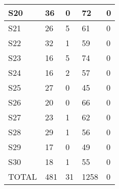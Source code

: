 \begin{table}[H]
\begin{tabular}{|l|p{2cm}|p{2cm}|l|p{2cm}|}
S20 & 36 & 0 & 72 & 0 \\ \hline
S21 & 26 & 5 & 61 & 0 \\ \hline
S22 & 32 & 1 & 59 & 0 \\ \hline
S23 & 16 & 5 & 74 & 0 \\ \hline
S24 & 16 & 2 & 57 & 0 \\ \hline
S25 & 27 & 0 & 45 & 0 \\ \hline
S26 & 20 & 0 & 66 & 0 \\ \hline
S27 & 23 & 1 & 62 & 0 \\ \hline
S28 & 29 & 1 & 56 & 0 \\ \hline
S29 & 17 & 0 & 49 & 0 \\ \hline
S30 & 18 & 1 & 55 & 0 \\ \hline
TOTAL & 481 & 31 & 1258 & 0 \\ \hline
\end{tabular}
\label{tab:raw2}
\end{table}

